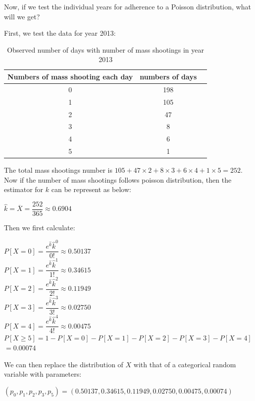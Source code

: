 \documentclass[12pt]{article}
\begin{document}
\par Now, if we test the individual years for adherence to a Poisson distribution, what will we get?
\par First, we test the data for year 2013:
\begin{table} [!htbp]
\begin{center}
\begin{tabular*} {14cm} {@{\extracolsep{\fill} }ccc}
\toprule
Numbers of mass shooting each day & numbers of days \\
\midrule
0 & 198 \\ \hline
1 & 105 \\ \hline
2 & 47 \\ \hline
3 & 8 \\ \hline
4 & 6  \\ \hline
5 & 1  \\
\bottomrule
\end{tabular*}
\end{center}
\caption{Observed number of days with number of mass shootings in year 2013}
\end{table}
\par The total mass shootings number is $105+47\times2+8\times3+6\times4+1\times5=252$. Now if the number of mass shootings follows poisson distribution, then the estimator for $k$ can be represent as below:
\begin{center}
$\hat k=\overline X=\dfrac{252}{365} \approx0.6904$
\end{center}
\par Then we first calculate:
\begin{center}
$P[X=0]=\dfrac{e^{\hat k}\hat k^0}{0!} \approx0.50137$\\
$P[X=1]=\dfrac{e^{\hat k}\hat k^1}{1!} \approx0.34615$\\
$P[X=2]=\dfrac{e^{\hat k}\hat k^2}{2!} \approx0.11949$\\
$P[X=3]=\dfrac{e^{\hat k}\hat k^3}{3!} \approx0.02750$\\
$P[X=4]=\dfrac{e^{\hat k}\hat k^4}{4!} \approx0.00475$\\
$P[X\geq5]=1-P[X=0]-P[X=1]-P[X=2]-P[X=3]-P[X=4]$\\
$=0.00074$
\end{center}
\par We can then replace the distribution of $X$ with that of a categorical random variable with parameters:
\begin{center}
$(p_0,p_1,p_2,p_3,p_5)=(0.50137,0.34615,0.11949,0.02750,0.00475,0.00074)$
\end{center}
\end{document}
